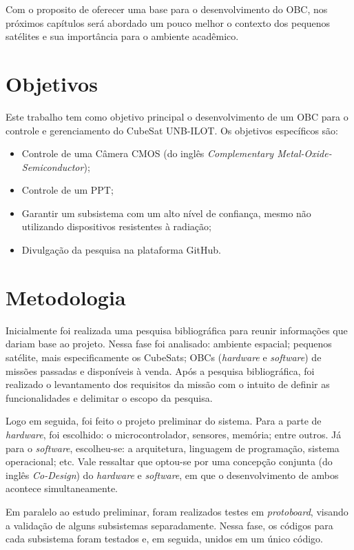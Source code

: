 Com o proposito de oferecer uma base para o desenvolvimento do OBC, nos próximos capítulos será abordado um pouco melhor o contexto dos pequenos satélites e sua importância para o ambiente acadêmico. 

\section{Objetivos}

Este trabalho tem como objetivo principal o desenvolvimento de um OBC para o controle e gerenciamento do CubeSat UNB-ILOT.  Os objetivos específicos são:

\begin{itemize}
	
	\item Controle de uma Câmera CMOS (do inglês \textit{Complementary Metal-Oxide-Semiconductor});
	\item Controle de um PPT;
	\item Garantir um subsistema com um alto nível de confiança, mesmo não utilizando dispositivos resistentes à radiação;
	\item Divulgação da pesquisa na plataforma GitHub.
	
\end{itemize}


\section{Metodologia}
\label{metodo}
Inicialmente foi realizada uma pesquisa bibliográfica para reunir informações que dariam base ao projeto. Nessa fase foi analisado: ambiente espacial; pequenos satélite, mais especificamente os CubeSats; OBCs (\textit{hardware} e \textit{software}) de missões passadas e disponíveis à venda. Após a pesquisa bibliográfica, foi realizado o levantamento dos requisitos da missão com o intuito de definir as funcionalidades e delimitar o escopo da pesquisa.

Logo em seguida, foi feito o projeto preliminar do sistema. Para a parte de \textit{hardware}, foi escolhido: o microcontrolador, sensores, memória; entre outros. Já para o \textit{software}, escolheu-se: a arquitetura, linguagem de programação, sistema operacional; etc. Vale ressaltar que optou-se por uma concepção conjunta (do inglês \textit{Co-Design}) do \textit{hardware} e \textit{software}, em que o desenvolvimento de ambos acontece simultaneamente.

Em paralelo ao estudo preliminar, foram realizados testes em \textit{protoboard}, visando a validação de alguns subsistemas separadamente. Nessa fase, os códigos para cada subsistema foram testados e, em seguida, unidos em um único código.

